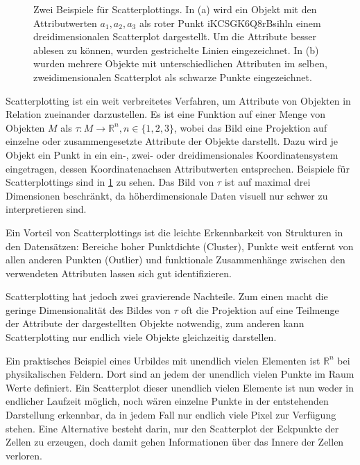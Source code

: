 \documentclass[a4paper,fontsize=12pt,toc=bib,parskip=half,ngerman]{scrartcl}
\begin{document}
\begin{figure}
\begin{subfigure}{0.30\textwidth}
		\caption{}
	\end{subfigure}
	\hspace{2cm}
	\caption{Zwei Beispiele f\"ur Scatterplottings. In (a) wird ein Objekt mit den Attributwerten $a_1, a_2, a_3$ als roter Punkt iKCSGK6Q8rBsihln einem dreidimensionalen Scatterplot dargestellt. Um die Attribute besser ablesen zu k\"onnen, wurden gestrichelte Linien eingezeichnet. In (b) wurden mehrere Objekte mit unterschiedlichen Attributen im selben, zweidimensionalen Scatterplot als schwarze Punkte eingezeichnet.}
	\label{Scatterplots}
\end{figure}

Scatterplotting ist ein weit verbreitetes Verfahren, um Attribute von Objekten in Relation zueinander darzustellen. Es ist eine Funktion auf einer Menge von Objekten $M$ als $\tau: M \rightarrow \mathbb{R}^n,n\in\{1,2,3\}$, wobei das Bild eine Projektion auf einzelne oder zusammengesetzte Attribute der Objekte darstellt.  Dazu wird je Objekt ein Punkt in ein ein-, zwei- oder dreidimensionales Koordinatensystem eingetragen, dessen Koordinatenachsen Attributwerten entsprechen. Beispiele f\"ur Scatterplottings sind in \cref{Scatterplots} zu sehen. Das Bild von $\tau$ ist auf maximal drei Dimensionen beschr\"ankt, da h\"oherdimensionale Daten visuell nur schwer zu interpretieren sind.

Ein Vorteil von Scatterplottings ist die leichte Erkennbarkeit von Strukturen in den Datens\"atzen: Bereiche hoher Punktdichte (Cluster), Punkte weit entfernt von allen anderen Punkten (Outlier) und funktionale Zusammenh\"ange zwischen den verwendeten Attributen lassen sich gut identifizieren. 

Scatterplotting hat jedoch zwei gravierende Nachteile. Zum einen macht die geringe Dimensionalit\"at des Bildes von $\tau$ oft die Projektion auf eine Teilmenge der Attribute der dargestellten Objekte notwendig, zum anderen kann Scatterplotting nur endlich viele Objekte gleichzeitig darstellen.

Ein praktisches Beispiel eines Urbildes mit unendlich vielen Elementen ist $\mathbb{R}^n$ bei physikalischen Feldern. Dort sind an jedem der unendlich vielen Punkte im Raum Werte definiert. Ein Scatterplot dieser unendlich vielen Elemente ist nun weder in endlicher Laufzeit m\"oglich, noch w\"aren einzelne Punkte in der entstehenden Darstellung erkennbar, da in jedem Fall nur endlich viele Pixel zur Verf\"ugung stehen. Eine Alternative besteht darin, nur den Scatterplot der Eckpunkte der Zellen zu erzeugen, doch damit gehen Informationen \"uber das Innere der Zellen verloren.
\end{document}
